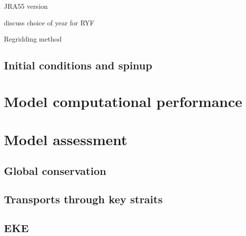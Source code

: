 \documentclass[11pt]{article}
\begin{document}
JRA55 version

discuss choice of year for RYF

Regridding method

\subsection{Initial conditions and spinup}

\section{Model computational performance}

\section{Model assessment}

\subsection{Global conservation}

\subsection{Transports through key straits}

\subsection{EKE}
\end{document}
